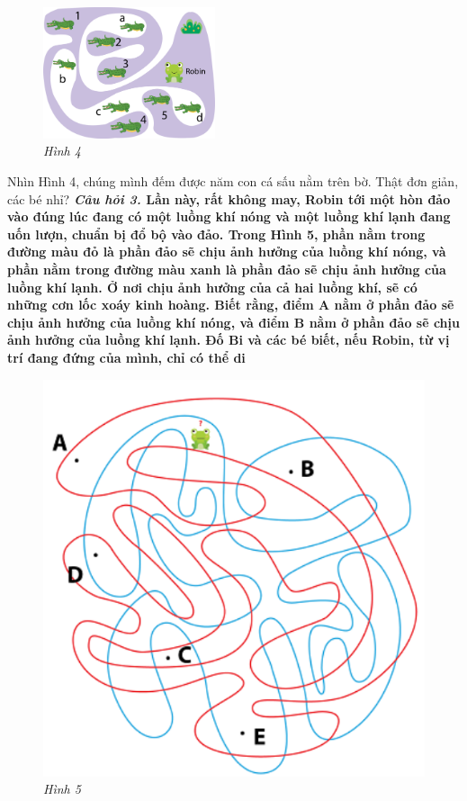 	\begin{figure}[H]
		\centering
		\vspace*{-10pt}
		\captionsetup{labelformat= empty, justification=centering}
		\includegraphics[width=0.45\textwidth]{pic13}
		\caption{\small\textit{Hình 4}}
		\vspace*{-10pt}
	\end{figure}
	Nhìn Hình 4, chúng mình đếm được năm con cá sấu nằm trên bờ. Thật đơn giản, các bé nhỉ?
	\vskip 0.1cm
	\textbf{\textit{Câu hỏi 3.} {\color{abc}Lần này, rất không may, Robin tới một hòn đảo vào đúng lúc đang có một luồng khí nóng và một luồng khí lạnh đang uốn lượn, chuẩn bị đổ bộ vào đảo. Trong  Hình 5, phần nằm trong đường màu đỏ là phần đảo sẽ chịu ảnh hưởng của luồng khí nóng, và phần nằm trong đường màu xanh là phần đảo sẽ chịu ảnh hưởng của luồng khí lạnh. Ở nơi chịu ảnh hưởng của cả hai luồng khí, sẽ có những cơn lốc xoáy kinh hoàng. Biết rằng, điểm $\pmb A$ nằm ở phần đảo sẽ chịu ảnh hưởng của luồng khí nóng, và điểm $\pmb B$ nằm ở phần đảo sẽ chịu ảnh hưởng của luồng khí lạnh. Đố Bi và các bé biết, nếu Robin, từ vị trí đang đứng của mình, chỉ có thể di}}
	\begin{figure}
		\vspace*{-5pt}
		\centering
		\captionsetup{labelformat=empty, justification=centering}
		\includegraphics[scale=0.38]{5}
		\caption{\textit{\small Hình 5}}
		\vspace*{-15pt}
	\end{figure}
